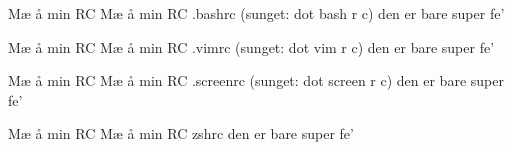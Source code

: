 \documentclass[a4paper,11pt]{article}
\begin{document}
\begin{song}
Mæ å min RC
Mæ å min RC
.bashrc (sunget: dot bash r c)
den er bare super fe'

Mæ å min RC
Mæ å min RC
.vimrc (sunget: dot vim r c)
den er bare super fe'

Mæ å min RC
Mæ å min RC
.screenrc (sunget: dot screen r c)
den er bare super fe'

Mæ å min RC
Mæ å min RC
zshrc
den er bare super fe'


\end{song}
\end{document}
